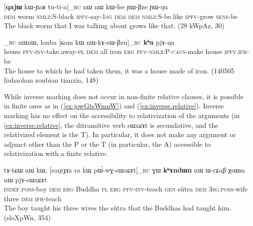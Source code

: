 \documentclass[oldfontcommands,oneside,a4paper,11pt]{article}
\newcommand{\ipa}[1]{{\phon#1}} %
\newcommand{\refb}[1]{(\ref{#1})}
\begin{document}
     \begin{exe}
   \ex \label{ex:tutianw}
 \gll \ipa{nɯ}  	[\ipa{\textbf{qajɯ}}  	\ipa{kɯ-ɲaʁ}  	\ipa{tu-ti-a}]_{\textsc{rc}}  	\ipa{nɯ}  	\ipa{nɯ}  	\ipa{kɯ-fse}  	\ipa{ɲɯ-βze}  	\ipa{ɲɯ-ŋu}  \\
\textsc{dem} worm \textsc{nmlz:S}-black \textsc{ipfv}-say-\textsc{1sg} \textsc{dem}  \textsc{dem} \textsc{nmlz:S}-be.like \textsc{ipfv}-grow \textsc{sens}-be \\
\glt The black worm that I was talking about grows like that. (28 kWpAz, 30)
\end{exe}

     \begin{exe}
   \ex \label{ex:jowGtsWmnW}
 \gll
[\ipa{\textbf{kʰa}}  	\ipa{jɤ́-wɣ-tsɯm-nɯ}]_{\textsc{rc}}  	\ipa{nɯnɯ,}  	\ipa{lonba}  	[\ipa{ɕom}  	\ipa{kɯ}  	\ipa{nɯ-kɤ-sɯ-βzu}]_{\textsc{rc}}  	\ipa{\textbf{kʰa}}  	\ipa{pjɤ-ŋu}  \\
house \textsc{pfv-inv}-take.away-\textsc{pl} \textsc{dem} all iron \textsc{erg} \textsc{pfv-nmlz:P-caus}-make house \textsc{ipfv.ifr}-be \\
\glt The house to which he had taken them, it was a house made of iron. (140505 liuhaohan zoubian tianxia, 148)
\end{exe}

While inverse marking does not occur in non-finite relative clauses, it is possible in finite ones as in \refb{ex:jowGtsWmnW} and \refb{ex:inverse.relative}. Inverse marking has no effect on the accessibility to relativization of the arguments (in \ref{ex:inverse.relative}, the ditransitive verb \ipa{sɯxɕɤt} is secundative, and the relativized element is the T). In particular, it does not make any argument or adjunct other than the P or the T (in particular, the A) accessible to relativization with a finite relative.

     \begin{exe}
   \ex \label{ex:inverse.relative}
 \gll
\ipa{tɤ-tɕɯ}  	\ipa{nɯ}  	\ipa{kɯ,}  	[\ipa{saŋrɟɤz}  	\ipa{ra}  	\ipa{kɯ}  	\ipa{pɯ́-wɣ-sɯxɕɤt}]_{\textsc{rc}}  	\ipa{ɣɯ}  	\ipa{\textbf{kʰɤndɯn}}  	\ipa{nɯ}  	\ipa{ɯ-rʑaβ}  	\ipa{χsɯm}  	\ipa{nɯ}  	\ipa{pjɤ-sɯxɕɤt}  \\
\textsc{indef.poss}-boy \textsc{dem} \textsc{erg} Buddha \textsc{pl} \textsc{erg} \textsc{pfv-inv}-teach   \textsc{gen} sûtra \textsc{dem} \textsc{3sg.poss}-wife three \textsc{dem} \textsc{ifr}-teach \\
\glt The boy taught his three wives the sûtra that the Buddhas had taught him. (sloXpWn, 354)
\end{exe}
\end{document}
